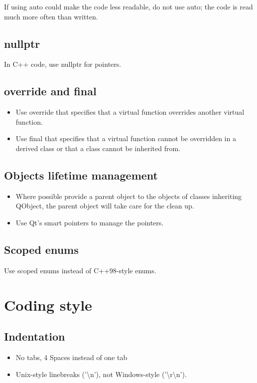 \documentclass[a4paper,12pt]{article}
\begin{document}
If using auto could make the code less readable, do not use auto; the code is read much more often than written.

\subsection{nullptr}
In C++ code, use nullptr for pointers. 

\subsection{override and final}
\begin{itemize}
 \item Use override that specifies that a virtual function overrides another virtual function. 
 \item Use final that specifies that a virtual function cannot be overridden in a derived class or that a class cannot be inherited from. 
\end{itemize}

\subsection{Objects lifetime management}
\begin{itemize}
 \item Where possible provide a parent object to the objects of classes inheriting QObject, the parent object will take care for the clean up.
 \item Use Qt's smart pointers to manage the pointers. 
\end{itemize} 
  
\subsection{Scoped enums}
Use scoped enums instead of C++98-style enums.



\clearpage
\newpage

\section{Coding style}\label{sec:code_conventions}
\subsection{Indentation}
\begin{itemize}
\item No tabs, 4 Spaces instead of one tab
\item Unix-style linebreaks ('\textbackslash n'), not Windows-style ('\textbackslash r\textbackslash n').
\end{itemize}
\end{document}
